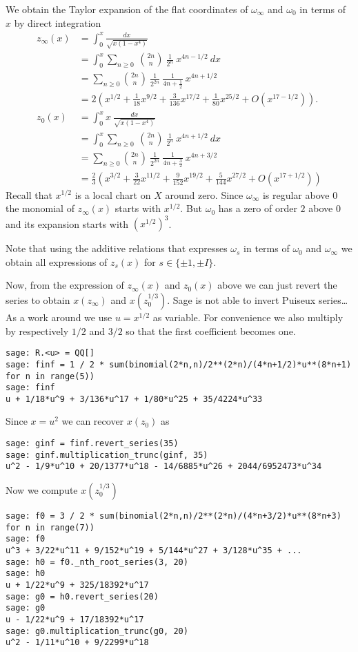 \documentclass[a4paper,12pt]{article}
\begin{document}
We obtain the Taylor expansion of the flat coordinates of $\omega_\infty$ and
$\omega_0$ in terms of $x$ by direct integration
\begin{align*}
z_\infty(x) &= \int_0^x \frac{dx}{\sqrt{x (1 - x^4)}} \\
 &= \int_0^x \sum_{n \ge 0}\ \binom{2n}{n}\ \frac{1}{2^n}\ x^{4n - 1/2}\ dx \\
 &= \sum_{n \ge 0} \binom{2n}{n}\ \frac{1}{2^{2n}}\ \frac{1}{4 n + \frac{1}{2}}\ x^{4n + 1/2} \\
 &= 2 \left( x^{1/2} + \frac{1}{18} x^{9/2} + \frac{3}{136} x^{17/2} + \frac{1}{80} x^{25/2} + O(x^{17-1/2}) \right). \\
z_0(x) &= \int_0^x x\ \frac{dx}{\sqrt{x (1 - x^4)}} \\
 &= \int_0^x \sum_{n \ge 0}\ \binom{2n}{n}\ \frac{1}{2^n}\ x^{4n + 1/2}\ dx \\
 &= \sum_{n \ge 0} \binom{2n}{n}\ \frac{1}{2^{2n}}\ \frac{1}{4 n + \frac{3}{2}}\ x^{4n + 3/2} \\
 &= 
\frac{2}{3} \left(
 x^{3/2} + \frac{3}{22} x^{11/2} + \frac{9}{152} x^{19/2} + \frac{5}{144} x^{27/2} + O(x^{17+1/2})
 \right)
\end{align*}
Recall that $x^{1/2}$ is a local chart on $X$ around zero. Since $\omega_\infty$ is regular above $0$ the monomial of $z_\infty(x)$ starts with $x^{1/2}$. But $\omega_0$ has a zero of order $2$ above $0$ and its expansion starts with $(x^{1/2})^3$.

Note that using the additive relations that expresses $\omega_s$ in terms of $\omega_0$
and $\omega_\infty$ we obtain all expressions of $z_s(x)$ for $s \in \{\pm 1, \pm I\}$.

Now, from the expression of $z_\infty(x)$ and $z_0(x)$ above we can just revert the series to obtain $x(z_\infty)$ and $x(z_0^{1/3})$. Sage is not able to invert Puiseux series\ldots As a work around we use $u=x^{1/2}$ as variable. For convenience we also multiply by respectively $1/2$ and $3/2$ so that the first coefficient becomes one.
\begin{verbatim}
sage: R.<u> = QQ[]
sage: finf = 1 / 2 * sum(binomial(2*n,n)/2**(2*n)/(4*n+1/2)*u**(8*n+1) for n in range(5))
sage: finf
u + 1/18*u^9 + 3/136*u^17 + 1/80*u^25 + 35/4224*u^33
\end{verbatim}
Since $x=u^2$ we can recover $x(z_0)$ as
\begin{verbatim}
sage: ginf = finf.revert_series(35)
sage: ginf.multiplication_trunc(ginf, 35)
u^2 - 1/9*u^10 + 20/1377*u^18 - 14/6885*u^26 + 2044/6952473*u^34
\end{verbatim}
Now we compute $x(z_0^{1/3})$
\begin{verbatim}
sage: f0 = 3 / 2 * sum(binomial(2*n,n)/2**(2*n)/(4*n+3/2)*u**(8*n+3) for n in range(7))
sage: f0
u^3 + 3/22*u^11 + 9/152*u^19 + 5/144*u^27 + 3/128*u^35 + ...
sage: h0 = f0._nth_root_series(3, 20)
sage: h0
u + 1/22*u^9 + 325/18392*u^17
sage: g0 = h0.revert_series(20)
sage: g0
u - 1/22*u^9 + 17/18392*u^17
sage: g0.multiplication_trunc(g0, 20)
u^2 - 1/11*u^10 + 9/2299*u^18
\end{verbatim}
\end{document}

